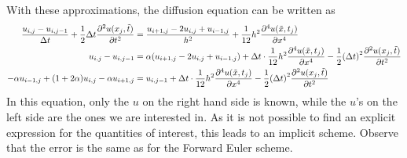 \documentclass[12pt,english,a4paper]{article}
\begin{document}
With these approximations, the diffusion equation can be written as
\begin{align*}
    \frac{u_{i,j}-u_{i,j-1}}{\Delta t} + \frac{1}{2}\Delta t\pdv[2]{u(x_j,\tilde{t})}{t}
    &= \frac{u_{i+1,j}  - 2u_{i,j} + u_{i-1,j}}{h^2} + \frac{1}{12}h^2\pdv[4]{u(\tilde{x},t_j)}{x}  \\
    u_{i,j}-u_{i,j-1} &= \alpha(u_{i+1,j}  - 2u_{i,j} + u_{i-1,j}) + \Delta t\cdot \frac{1}{12}h^2\pdv[4]{u(\tilde{x},t_j)}{x}  - \frac{1}{2}\qty(\Delta t)^2\pdv[2]{u(x_j,\tilde{t})}{t}\\
    -\alpha u_{i-1,j} + \qty(1+2\alpha)u_{i,j} - \alpha u_{i+1,j} &= u_{i,j-1} + \Delta t\cdot \frac{1}{12}h^2\pdv[4]{u(\tilde{x},t_j)}{x}  - \frac{1}{2}\qty(\Delta t)^2\pdv[2]{u(x_j,\tilde{t})}{t}
\end{align*}
In this equation, only the \(u\) on the right hand side is known, while the \(u\)'s on the left side are the ones we are interested in. As it is not possible to find an explicit expression for the quantities of interest, this leads to an implicit scheme. Observe that the error is the same as for the Forward Euler scheme.
\end{document}
